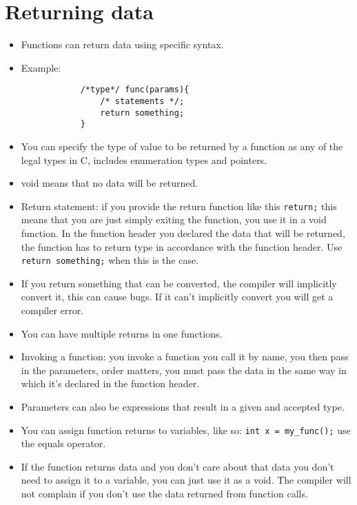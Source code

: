 \section{Returning data}
\begin{itemize}
    \item Functions can return data using specific syntax. 
    \item Example: 
        \begin{verbatim}
            /*type*/ func(params){
                /* statements */; 
                return something;
            }
        \end{verbatim}
    
    \item You can specify the type of value to be returned by a function as any of the legal types in C, includes enumeration types and pointers. 
    \item void means that no data will be returned. 
    \item Return statement: if you provide the return function like this \texttt{return;} this means that you are just simply exiting the function, you use it in a void function. In the function header you declared the data that will be returned, the function has to return type in accordance with the function header. Use \texttt{return something;} when this is the case. 
    \item If you return something that can be converted, the compiler will implicitly convert it, this can cause bugs. If it can't implicitly convert you will get a compiler error. 
    \item You can have multiple returns in one functions.  
    \item Invoking a function: you invoke a function you call it by name, you then pass in the parameters, order matters, you must pass the data in the same way in which it's declared in the function header. 
    \item Parameters can also be expressions that result in a given and accepted type. 
    \item You can assign function returns to variables, like so: \texttt{int x = my_func();} use the equals operator. 
    \item If the function returns data and you don't care about that data you don't need to assign it to a variable, you can just use it as a void. The compiler will not complain if you don't use the data returned from function calls. 
\end{itemize}
